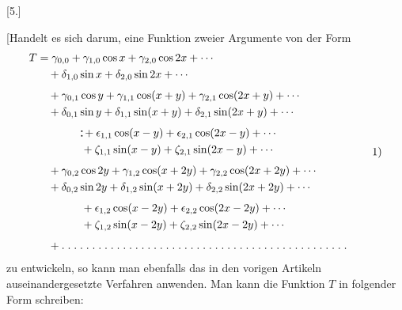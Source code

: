 \clearpage
\begin{landscape}
\begingroup
\fontsize{10}{13}\selectfont
{}
\renewcommand{\headrulewidth}{0pt}
\setlength{\lineskip}{4pt}\setlength{\lineskiplimit}{4pt}
\setlength{\arraycolsep}{4pt}
\makeatletter\tagsleft@true\makeatother
\newcommand{\VFivePair}{\mathord{\vcenter{\offinterlineskip\hbox{\rule{.12em}{.12em}}\kern.30em\hbox{\rule{.12em}{.12em}}}}}
\newcommand{\VFivePoint}{\mathord{.}\mkern5mu}
\newcommand{\VFiveTenPoints}{\VFivePoint\VFivePoint\VFivePoint\VFivePoint\VFivePoint\VFivePoint\VFivePoint\VFivePoint\VFivePoint\VFivePoint}
\begin{center}[5.]\end{center}
\par\noindent\hspace*{\parindent}[Handelt es sich darum, eine Funktion zweier Argumente von der Form
\[
\begin{aligned}
T&=\gamma_{0,0}+\gamma_{1,0}\cos x+\gamma_{2,0}\cos2x+\cdots\\
 &\quad+\delta_{1,0}\sin x+\delta_{2,0}\sin2x+\cdots\\[4pt]
 &\quad+\gamma_{0,1}\cos y+\gamma_{1,1}\cos(x+y)+\gamma_{2,1}\cos(2x+y)+\cdots\\
 &\quad+\delta_{0,1}\sin y+\delta_{1,1}\sin(x+y)+\delta_{2,1}\sin(2x+y)+\cdots\\[4pt]
 &\qquad\qquad\VFivePair+\epsilon_{1,1}\cos(x-y)+\epsilon_{2,1}\cos(2x-y)+\cdots\\
 &\qquad\qquad+\zeta_{1,1}\sin(x-y)+\zeta_{2,1}\sin(2x-y)+\cdots\\[4pt]
 &\quad+\gamma_{0,2}\cos2y+\gamma_{1,2}\cos(x+2y)+\gamma_{2,2}\cos(2x+2y)+\cdots\\
 &\quad+\delta_{0,2}\sin2y+\delta_{1,2}\sin(x+2y)+\delta_{2,2}\sin(2x+2y)+\cdots\\[4pt]
 &\qquad\qquad+\epsilon_{1,2}\cos(x-2y)+\epsilon_{2,2}\cos(2x-2y)+\cdots\\
 &\qquad\qquad+\zeta_{1,2}\sin(x-2y)+\zeta_{2,2}\sin(2x-2y)+\cdots\\[4pt]
 &\quad+\VFiveTenPoints\VFiveTenPoints\VFiveTenPoints\VFiveTenPoints\VFivePoint\VFivePoint\VFivePoint\VFivePoint\VFivePoint\VFivePoint\VFivePoint
\end{aligned}\tag*{1)}
\]
zu entwickeln, so kann man ebenfalls das in den vorigen Artikeln auseinandergesetzte Verfahren anwenden. Man kann die Funktion \(T\) in folgender Form schreiben:

\end{landscape}
